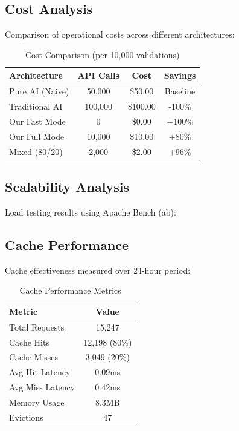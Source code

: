 \documentclass[conference]{IEEEtran}
\begin{document}
\subsection{Cost Analysis}

Comparison of operational costs across different architectures:

\begin{table}[htbp]
\caption{Cost Comparison (per 10,000 validations)}
\begin{center}
\begin{tabular}{|l|c|c|c|}
\hline
\textbf{Architecture} & \textbf{API Calls} & \textbf{Cost} & \textbf{Savings} \\
\hline
Pure AI (Naive) & 50,000 & \$50.00 & Baseline \\
Traditional AI & 100,000 & \$100.00 & -100\% \\
Our Fast Mode & 0 & \$0.00 & +100\% \\
Our Full Mode & 10,000 & \$10.00 & +80\% \\
Mixed (80/20) & 2,000 & \$2.00 & +96\% \\
\hline
\end{tabular}
\label{tab:cost}
\end{center}
\end{table}

\subsection{Scalability Analysis}

Load testing results using Apache Bench (ab):

\subsection{Cache Performance}

Cache effectiveness measured over 24-hour period:

\begin{table}[htbp]
\caption{Cache Performance Metrics}
\begin{center}
\begin{tabular}{|l|c|}
\hline
\textbf{Metric} & \textbf{Value} \\
\hline
Total Requests & 15,247 \\
Cache Hits & 12,198 (80\%) \\
Cache Misses & 3,049 (20\%) \\
Avg Hit Latency & 0.09ms \\
Avg Miss Latency & 0.42ms \\
Memory Usage & 8.3MB \\
Evictions & 47 \\
\hline
\end{tabular}
\label{tab:cache}
\end{center}
\end{table}
\end{document}
